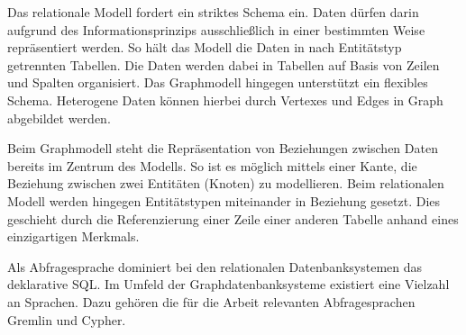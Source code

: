 Das relationale Modell fordert ein striktes Schema ein. Daten dürfen darin aufgrund des Informationsprinzips ausschließlich in einer bestimmten Weise repräsentiert werden. So hält das Modell die Daten in nach Entitätstyp getrennten Tabellen. Die Daten werden dabei in Tabellen auf Basis von Zeilen und Spalten organisiert. Das Graphmodell hingegen unterstützt ein flexibles Schema. Heterogene Daten können hierbei durch Vertexes und Edges in Graph abgebildet werden. 

Beim Graphmodell steht die Repräsentation von Beziehungen zwischen Daten bereits im Zentrum des Modells. So ist es möglich mittels einer Kante, die Beziehung zwischen zwei Entitäten (Knoten) zu modellieren. Beim relationalen Modell werden hingegen Entitätstypen miteinander in Beziehung gesetzt. Dies geschieht durch die Referenzierung einer Zeile einer anderen Tabelle anhand eines einzigartigen Merkmals.

Als Abfragesprache dominiert bei den relationalen Datenbanksystemen das deklarative SQL. Im Umfeld der Graphdatenbanksysteme existiert eine Vielzahl an Sprachen. Dazu gehören die für die Arbeit relevanten Abfragesprachen Gremlin und Cypher. 